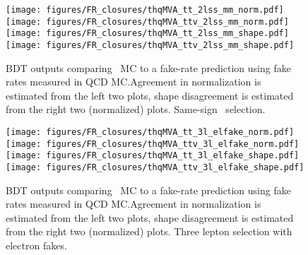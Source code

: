 \begin{figure}[htb]
 \centering
 \texttt{[image: figures/FR\_closures/thqMVA\_tt\_2lss\_mm\_norm.pdf]} 
 \texttt{[image: figures/FR\_closures/thqMVA\_ttv\_2lss\_mm\_norm.pdf]} 
 \texttt{[image: figures/FR\_closures/thqMVA\_tt\_2lss\_mm\_shape.pdf]} 
 \texttt{[image: figures/FR\_closures/thqMVA\_ttv\_2lss\_mm\_shape.pdf]} \\
\caption{BDT outputs comparing \ttbar\ MC to a fake-rate prediction using fake rates measured in QCD MC.\@ Agreement in normalization is estimated from the left two plots, shape disagreement is estimated from the right two (normalized) plots. Same-sign \mumu\ selection.} 
\label{fig:frclosure_2lss_mm}
\end{figure} 

\begin{figure}[htb]
 \centering
 \texttt{[image: figures/FR\_closures/thqMVA\_tt\_3l\_elfake\_norm.pdf]} 
 \texttt{[image: figures/FR\_closures/thqMVA\_ttv\_3l\_elfake\_norm.pdf]} 
 \texttt{[image: figures/FR\_closures/thqMVA\_tt\_3l\_elfake\_shape.pdf]} 
 \texttt{[image: figures/FR\_closures/thqMVA\_ttv\_3l\_elfake\_shape.pdf]} \\
\caption{BDT outputs comparing \ttbar\ MC to a fake-rate prediction using fake rates measured in QCD MC.\@ Agreement in normalization is estimated from the left two plots, shape disagreement is estimated from the right two (normalized) plots. Three lepton selection with electron fakes.} 
\label{fig:frclosure_3l_elfake}
\end{figure} 

